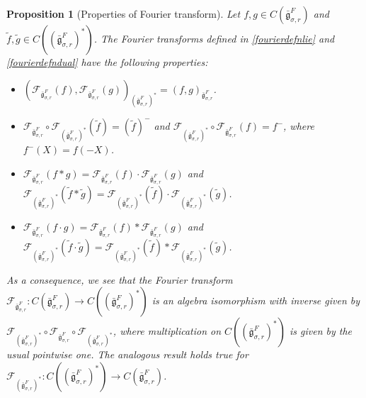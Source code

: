 \documentclass[11 pt]{article}
\numberwithin{equation}{subsection}
\newtheorem{proposition}[theorem]{Proposition}
\theoremstyle{definition}
\theoremstyle{remark}
\theoremstyle{conjecture}
\newcommand{\bg}{\bar{\mathfrak g}}
\newcommand{\mcF}{\mathcal F}
\begin{document}
\begin{proposition}[Properties of Fourier transform]\label{fourierprop}
    Let  $f,g \in C\left(\bg_{\sigma,r}^F\right)$ and $\tilde f, \tilde g \in C\left((\bg_{\sigma,r}^F)^*\right)$. The Fourier transforms defined in \eqref{fourierdefnlie} and \eqref{fourierdefndual} have the following properties:
    \begin{itemize}
        \item[(i)]  $\left(\mcF_{\bg_{\sigma,r}^F}(f),\mcF_{\bg_{\sigma,r}^F}(g)\right)_{(\bg_{\sigma,r}^F)^*}= \left(f,g\right)_{\bg_{\sigma,r}^F}$. 
        \item [(ii)]  $\mcF_{\bg_{\sigma,r}^F}\circ \mcF_{(\bg_{\sigma,r}^F)^*}(\tilde f) = (\tilde f)^-$ and $ \mcF_{(\bg_{\sigma,r}^F)^*}\circ\mcF_{\bg_{\sigma,r}^F}(f)=f^-$, where $f^-(X)=f(-X)$. 
        \item[(iii)]  $\mcF_{\bg_{\sigma,r}^F}(f*g)= \mcF_{\bg_{\sigma,r}^F}(f)\cdot \mcF_{\bg_{\sigma,r}^F}(g)$ and $\mcF_{(\bg_{\sigma,r}^F)^*} (\tilde f*\tilde g )=\mcF_{(\bg_{\sigma,r}^F)^*} (\tilde f) \cdot \mcF_{(\bg_{\sigma,r}^F)^*}(\tilde g) $.
        \item[(iv)] $\mcF_{\bg_{\sigma,r}^F}(f\cdot g)= \mcF_{\bg_{\sigma,r}^F}(f)* \mcF_{\bg_{\sigma,r}^F}(g)$ and $\mcF_{(\bg_{\sigma,r}^F)^*} (\tilde f\cdot \tilde g )=\mcF_{(\bg_{\sigma,r}^F)^*} (\tilde f) * \mcF_{(\bg_{\sigma,r}^F)^*}(\tilde g)$.
    \end{itemize}
    As a consequence, we see that the Fourier transform $\mcF_{\bg_{\sigma,r}^F}:C(\bg_{\sigma,r}^F) \longrightarrow C\left((\bg_{\sigma,r}^F)^*\right)$ is an algebra isomorphism with inverse given by $\mcF_{(\bg_{\sigma,r}^F)^*}\circ \mcF_{\bg_{\sigma,r}^F}\circ \mcF_{(\bg_{\sigma,r}^F)^*}$, where multiplication on $C\left((\bg_{\sigma,r}^F)^*\right)$ is given by the usual pointwise one. The analogous result holds true for  $\mcF_{(\bg_{\sigma,r}^F)^*}:C\left((\bg_{\sigma,r}^F)^*\right) \longrightarrow C(\bg_{\sigma,r}^F) $.
\end{proposition}
\end{document}
